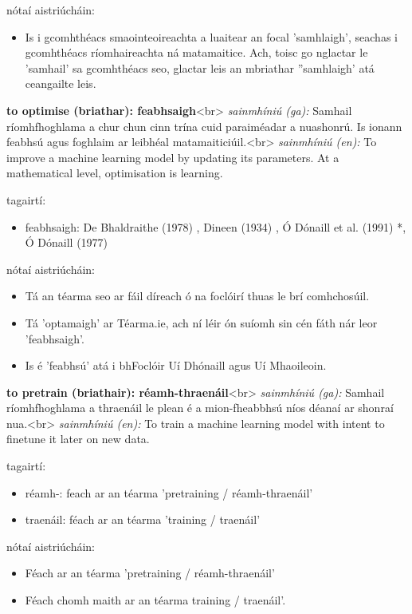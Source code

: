 \documentclass{article}
\begin{document}
nótaí aistriúcháin:
\begin{itemize}
	\item Is i gcomhthéacs smaointeoireachta a luaitear an focal 'samhlaigh', seachas i gcomhthéacs ríomhaireachta ná matamaitice. Ach, toisc go nglactar le 'samhail' sa gcomhthéacs seo, glactar leis an mbriathar ''samhlaigh' atá ceangailte leis.
\end{itemize}


\textbf{to optimise (briathar): feabhsaigh}<br>
\textit{sainmhíniú (ga):} Samhail ríomhfhoghlama a chur chun cinn trína cuid paraiméadar a nuashonrú. Is ionann feabhsú agus foghlaim ar leibhéal matamaiticiúil.<br>
\textit{sainmhíniú (en):} To improve a machine learning model by updating its parameters. At a mathematical level, optimisation is learning.

tagairtí:
\begin{itemize}
	\item feabhsaigh: De Bhaldraithe (1978) \cite{de-bhaldraithe}, Dineen (1934) \cite{dineen}, Ó Dónaill et al. (1991) \cite{focloir-beag}*, Ó Dónaill (1977) \cite{odonaill}
\end{itemize}

nótaí aistriúcháin:
\begin{itemize}
	\item Tá an téarma seo ar fáil díreach ó na foclóirí thuas le brí comhchosúil.
	\item Tá 'optamaigh' ar Téarma.ie, ach ní léir ón suíomh sin cén fáth nár leor 'feabhsaigh'.
	\item Is é 'feabhsú' atá i bhFoclóir Uí Dhónaill agus Uí Mhaoileoin.
\end{itemize}


\textbf{to pretrain (briathair): réamh-thraenáil}<br>
\textit{sainmhíniú (ga):} Samhail ríomhfhoghlama a thraenáil le plean é a mion-fheabbhsú níos déanaí ar shonraí nua.<br>
\textit{sainmhíniú (en):} To train a machine learning model with intent to finetune it later on new data.

tagairtí:
\begin{itemize}
	\item réamh-: feach ar an téarma 'pretraining / réamh-thraenáil'
	\item traenáil: féach ar an téarma 'training / traenáil'
\end{itemize}

nótaí aistriúcháin:
\begin{itemize}
	\item Féach ar an téarma 'pretraining / réamh-thraenáil'
	\item Féach chomh maith ar an téarma training / traenáil'.
\end{itemize}
\end{document}
